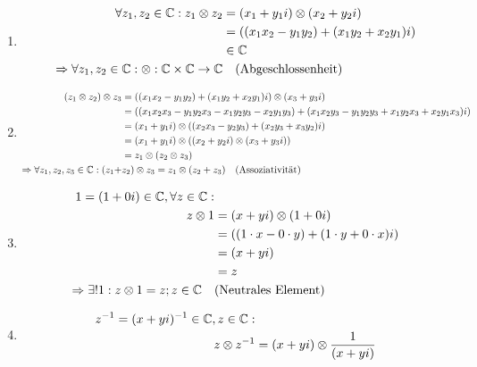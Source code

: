 \documentclass[../MAIN/main.tex]{subfiles}
\begin{document}
\begin{Beweis}
		\begin{enumerate}[1)]
			\item \begin{align*}
						\forall z_1, z_2 \in \C: z_1 \otimes z_2 &\definedBy (x_1 + y_1i) \otimes (x_2 + y_2i) \\
														   		 &= ((x_1x_2 - y_1y_2) + (x_1y_2 + x_2y_1)i) \\
														   		 &\in \C \\
						\Rightarrow \forall z_1, z_2 \in \C: \otimes : \C \times \C \rightarrow \C & \quad \text{(Abgeschlossenheit)}
				  \end{align*}
			\item \begin{align*}
				  		(z_1 \otimes z_2) \otimes z_3 &= ((x_1x_2 - y_1y_2) + (x_1y_2 + x_2y_1)i) \otimes (x_3 + y_3i) \\
										  			  &= ((x_1x_2x_3 - y_1y_2x_3 - x_1y_2y_3 - x_2y_1y_3) + (x_1x_2y_3 - y_1y_2y_3 + x_1y_2x_3 + x_2y_1x_3)i) \\
												      &= (x_1 + y_1i) \otimes ((x_2x_3 - y_2y_3) + (x_2y_3 + x_3y_2)i) \\
												      &= (x_1 + y_1i) \otimes ((x_2 + y_2i) \otimes (x_3 + y_3i)) \\
												      &= z_1 \otimes (z_2 \otimes z_3) \\
						\Rightarrow \forall z_1, z_2, z_3 \in \mathbb{C}: (z_1 + &z_2) \otimes  z_3 = z_1 \otimes (z_2 + z_3) \quad \text{(Assoziativität)}
				  \end{align*}
			\item \begin{align*}
						1 = (1 + 0i) \in \mathbb{C}, \forall z \in \mathbb{C}:& \\
												   z \otimes 1 &= (x + yi) \otimes (1 + 0i) \\
													  		   &= ((1 \cdot x - 0 \cdot y) + (1 \cdot y + 0 \cdot x)i) \\
															   &= (x + yi) \\
															   &= z \\
						\Rightarrow \exists! 1: z \otimes 1 = z; z \in \mathbb{C} \quad &\text{(Neutrales Element)}
				  \end{align*}
			\item \begin{align*}
	  					z^{-1} = (x + yi)^{-1} \in \C, z \in \C:& \\
								  z \otimes z^{-1} &= (x + yi) \otimes \dfrac{1}{(x + yi)} \\

\end{align*}
\end{enumerate}
\end{Beweis}
\end{document}
